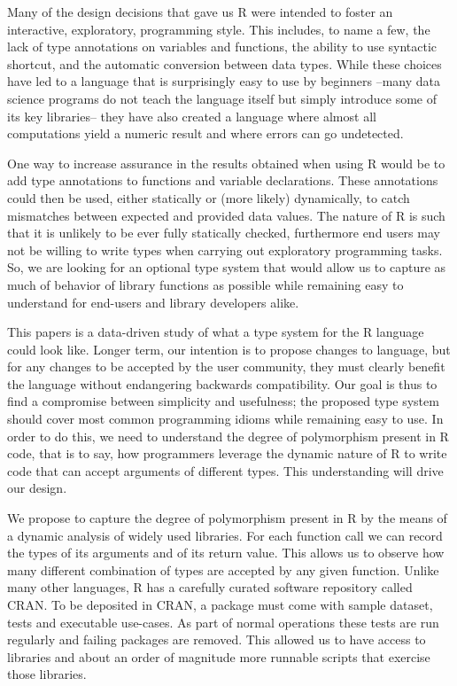 \documentclass[acmsmall,10pt,review,anonymous]{acmart}\settopmatter{printfolios=true,printccs=false,printacmref=false}
\begin{document}
Many of the design decisions that gave us R were intended to foster an
interactive, exploratory, programming style. This includes, to name a few,
the lack of type annotations on variables and functions, the ability to use
syntactic shortcut, and the automatic conversion between data types.  While
these choices have led to a language that is surprisingly easy to use by
beginners --many data science programs do not teach the language itself but
simply introduce some of its key libraries-- they have also created a
language where almost all computations yield a numeric result and where
errors can go undetected. 

One way to increase assurance in the results obtained when using R would be
to add type annotations to functions and variable declarations. These
annotations could then be used, either statically or (more likely)
dynamically, to catch mismatches between expected and provided data values.
The nature of R is such that it is unlikely to be ever fully statically
checked, furthermore end users may not be willing to write types when
carrying out exploratory programming tasks. So, we are looking for an
optional type system that would allow us to capture as much of behavior of
library functions as possible while remaining easy to understand for
end-users and library developers alike.

This papers is a data-driven study of what a type system for the R language
could look like. Longer term, our intention is to propose changes to
language, but for any changes to be accepted by the user community, they
must clearly benefit the language without endangering backwards
compatibility. Our goal is thus to find a compromise between simplicity and
usefulness; the proposed type system should cover most common programming
idioms while remaining easy to use. In order to do this, we need to
understand the degree of polymorphism present in R code, that is to say, how
programmers leverage the dynamic nature of R to write code that can accept
arguments of different types.  This understanding will drive our design.

We propose to capture the degree of polymorphism present in R by the means
of a dynamic analysis of widely used libraries. For each function call we
can record the types of its arguments and of its return value. This allows
us to observe how many different combination of types are accepted by any
given function. Unlike many other languages, R has a carefully curated
software repository called CRAN. To be deposited in CRAN, a package must
come with sample dataset, tests and executable use-cases. As part of normal
operations these tests are run regularly and failing packages are removed.
This allowed us to have access to \PACKAGES libraries and about an order of
magnitude more runnable scripts that exercise those libraries.
\end{document}
